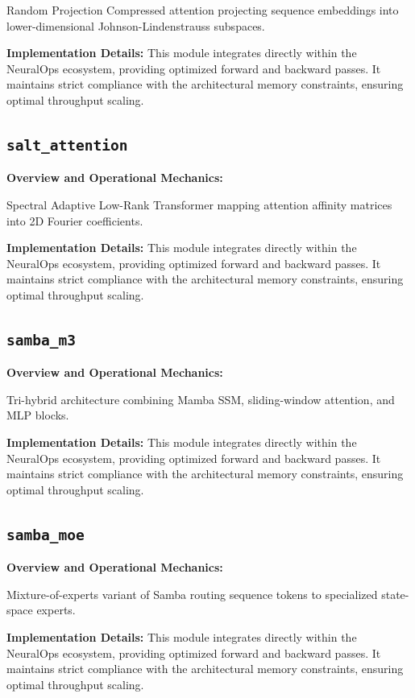 \documentclass[10pt,twocolumn,letterpaper]{article}
\begin{document}
Random Projection Compressed attention projecting sequence embeddings into lower-dimensional Johnson-Lindenstrauss subspaces.

\textbf{Implementation Details:}
This module integrates directly within the NeuralOps ecosystem, providing optimized forward and backward passes. It maintains strict compliance with the architectural memory constraints, ensuring optimal throughput scaling.

\subsection{\texttt{salt\_attention}}
\textbf{Overview and Operational Mechanics:}

Spectral Adaptive Low-Rank Transformer mapping attention affinity matrices into 2D Fourier coefficients.

\textbf{Implementation Details:}
This module integrates directly within the NeuralOps ecosystem, providing optimized forward and backward passes. It maintains strict compliance with the architectural memory constraints, ensuring optimal throughput scaling.

\subsection{\texttt{samba\_m3}}
\textbf{Overview and Operational Mechanics:}

Tri-hybrid architecture combining Mamba SSM, sliding-window attention, and MLP blocks.

\textbf{Implementation Details:}
This module integrates directly within the NeuralOps ecosystem, providing optimized forward and backward passes. It maintains strict compliance with the architectural memory constraints, ensuring optimal throughput scaling.

\subsection{\texttt{samba\_moe}}
\textbf{Overview and Operational Mechanics:}

Mixture-of-experts variant of Samba routing sequence tokens to specialized state-space experts.

\textbf{Implementation Details:}
This module integrates directly within the NeuralOps ecosystem, providing optimized forward and backward passes. It maintains strict compliance with the architectural memory constraints, ensuring optimal throughput scaling.
\end{document}
